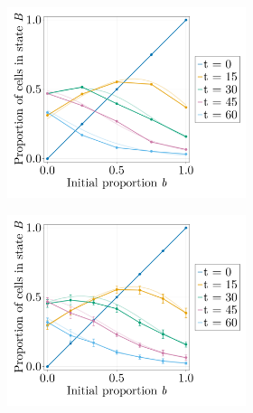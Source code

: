 \begin{figure}[p]
    \centering
    \begin{subfigure}{\textwidth}
        \centering
        \begin{subfigure}{0.47\textwidth}
            \centering
            \includegraphics[width=\textwidth]{figures/407/407-phib-vs-b-simulation-1ite-fp0-vs-meanfield.png}
        \end{subfigure}
        \hfill
        \begin{subfigure}{0.47\textwidth}
            \centering
            \includegraphics[width=\textwidth]{figures/408/408-phib-vs-b-simulation-10ite-fp0-cellcell-vs-meanfield.png}

\end{subfigure}
\end{subfigure}
\end{figure}
